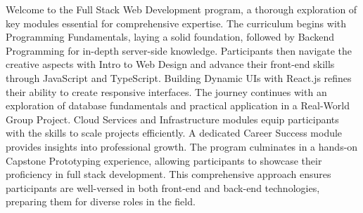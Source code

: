 Welcome to the Full Stack Web Development program, a thorough exploration of key modules essential for
comprehensive expertise. The curriculum begins with Programming Fundamentals, laying a solid foundation,
followed by Backend Programming for in-depth server-side knowledge. Participants then navigate the creative
aspects with Intro to Web Design and advance their front-end skills through JavaScript and TypeScript. Building
Dynamic UIs with React.js refines their ability to create responsive interfaces. The journey continues with an
exploration of database fundamentals and practical application in a Real-World Group Project. Cloud Services and
Infrastructure modules equip participants with the skills to scale projects efficiently. A dedicated Career Success
module provides insights into professional growth. The program culminates in a hands-on Capstone Prototyping
experience, allowing participants to showcase their proficiency in full stack development. This comprehensive
approach ensures participants are well-versed in both front-end and back-end technologies, preparing them for
diverse roles in the field.
